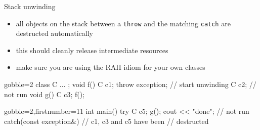 \begin{frame}[fragile]
  \begin{block}{Stack unwinding}
    \begin{itemize}
      \item all objects on the stack between a \texttt{throw} and the matching \texttt{catch} are destructed automatically
      \item this should cleanly release intermediate resources
      \item make sure you are using the RAII idiom for your own classes
    \end{itemize}
  \end{block}
  \begin{multicols}{2}
    \begin{cppcode*}{gobble=2}
      class C { ... };
      void f() {
        C c1;
        throw exception{};
          // start unwinding
        C c2; // not run
      }
      void g() {
        C c3; f();
      }
    \end{cppcode*}
    \columnbreak
    \begin{cppcode*}{gobble=2,firstnumber=11}
      int main() {
        try {
          C c5;
          g();
          cout << "done"; // not run
        } catch(const exception&) {
          // c1, c3 and c5 have been
          // destructed
        }
      }
    \end{cppcode*}
  \end{multicols}
\end{frame}

